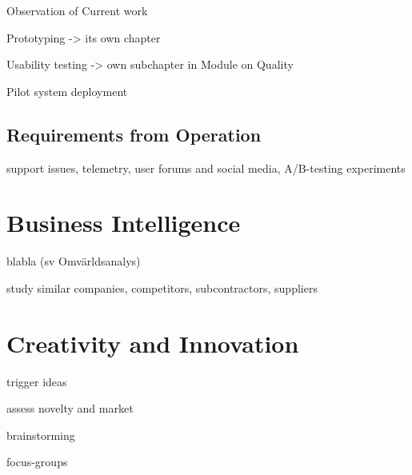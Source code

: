 Observation of Current work 

Prototyping -> its own chapter 

Usability testing -> own subchapter in Module on Quality

Pilot system deployment

\subsection{Requirements from Operation}

support issues, telemetry, user forums and social media, A/B-testing experiments


\section{Business Intelligence}
blabla  (sv Omvärldsanalys)

study similar companies, competitors, subcontractors, suppliers 

\section{Creativity and Innovation}

trigger ideas 

assess novelty and market 

brainstorming

focus-groups
